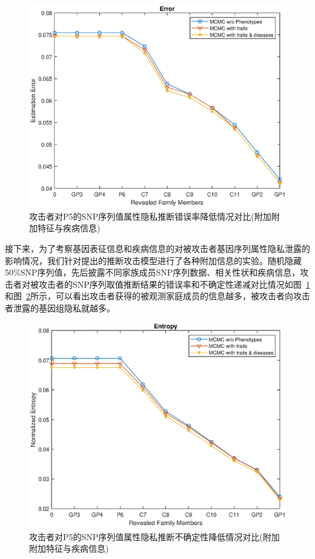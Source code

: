 \begin{figure}[htbp]
	\centering
	\includegraphics[width=0.8\linewidth]{./figures/P5error2.eps}
	\centering
	\caption{攻击者对P5的SNP序列值属性隐私推断错误率降低情况对比(附加附加特征与疾病信息)}\label{fig:P5error2}
\end{figure}


接下来，为了考察基因表征信息和疾病信息的对被攻击者基因序列属性隐私泄露的影响情况，我们针对提出的推断攻击模型进行了各种附加信息的实验。随机隐藏50\%SNP序列值，先后披露不同家族成员SNP序列数据、相关性状和疾病信息，攻击者对被攻击者的SNP序列取值推断结果的错误率和不确定性递减对比情况如图~\ref{fig:P5error2}和图~\ref{fig:P5entropy2}所示，可以看出攻击者获得的被观测家庭成员的信息越多，被攻击者向攻击者泄露的基因组隐私就越多。

\begin{figure}[htbp]
	\centering
	\includegraphics[width=0.8\linewidth]{./figures/P5entropy2.eps}
	\centering
	\caption{攻击者对P5的SNP序列值属性隐私推断不确定性降低情况对比(附加附加特征与疾病信息)}\label{fig:P5entropy2}
\end{figure}


